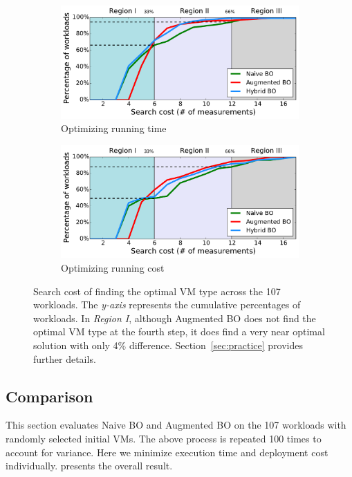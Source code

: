 \begin{figure}[!htbp]
\centering
\begin{subfigure}[b]{0.8\textwidth}
    \centering
    \includegraphics[width=\linewidth]{figures/overall_time_new.pdf}
    \caption{Optimizing running time}
    \label{fig:overall_time}
\end{subfigure}
\begin{subfigure}[b]{0.8\textwidth}
    \centering
    \includegraphics[width=\linewidth]{figures/overall_cost_new.pdf}
    \caption{Optimizing running cost}
    \label{fig:overall_cost}
\end{subfigure}
\caption{Search cost of finding the optimal VM type across the 107 workloads. The \emph{y-axis} represents the cumulative percentages of workloads.
 In \emph{Region I}, although Augmented BO does not find the optimal VM type at the fourth step, it does find a very near optimal solution with only 4\% difference.
 Section~\ref{sec:practice} provides further details.}
\label{fig:overall}
\end{figure}

\subsection{Comparison}
\label{sec:comparison}
This section evaluates Naive BO and Augmented BO on the 107 workloads with randomly selected initial VMs. The above process is repeated 100 times to account for variance.
Here we minimize execution time and deployment cost individually. 
\myfigure{\ref{fig:overall}} presents the overall result. %



